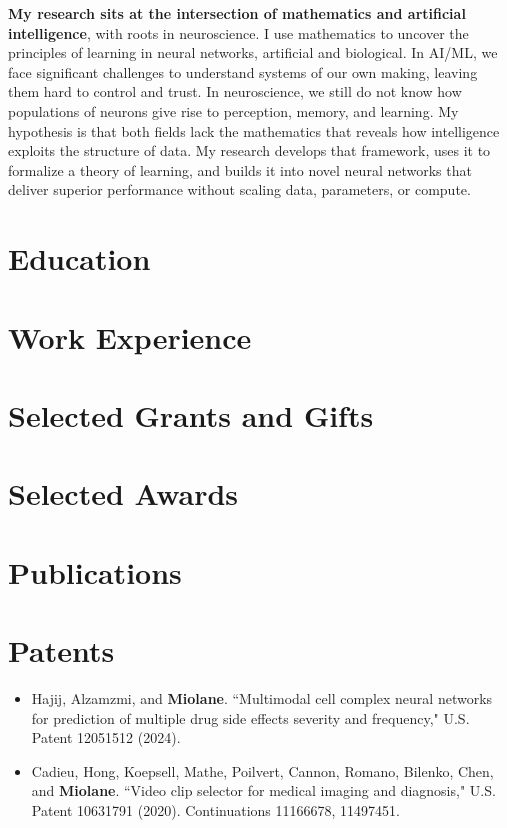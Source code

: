 \documentclass[a4paper,12pt]{article}
\begin{document}
\textbf{My research sits at the intersection of mathematics and artificial intelligence}, with roots in neuroscience. I use mathematics to uncover the principles of learning in neural networks, artificial and biological. In AI/ML, we face significant challenges to understand systems of our own making, leaving them hard to control and trust. In neuroscience, we still do not know how populations of neurons give rise to perception, memory, and learning. My hypothesis is that both fields lack the mathematics that reveals how intelligence exploits the structure of data. My research develops that framework, uses it to formalize a theory of learning, and builds it into novel neural networks that deliver superior performance without scaling data, parameters, or compute.

\section{Education}


\section{Work Experience}


\section{Selected Grants and Gifts}


\section{Selected Awards}


\section{Publications}


\section{Patents}
\begin{itemize}[leftmargin=*,itemsep=0.1em,topsep=0.2em,parsep=0pt,partopsep=0pt]
  \item Hajij, Alzamzmi, and \textbf{Miolane}. ``Multimodal cell complex neural networks for prediction of multiple drug side effects severity and frequency," U.S. Patent 12051512 (2024).
  \item Cadieu, Hong, Koepsell, Mathe, Poilvert, Cannon, Romano, Bilenko, Chen, and \textbf{Miolane}. ``Video clip selector for medical imaging and diagnosis," U.S. Patent  10631791 (2020). Continuations 11166678, 11497451.
\end{itemize}
\end{document}

